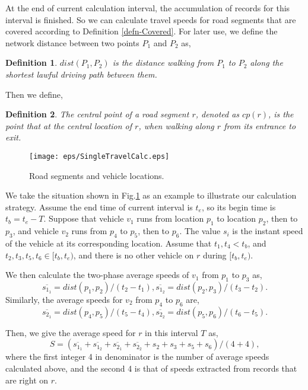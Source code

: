 \documentclass[twocolumn,10pt,final,conference]{IEEEtran}
\newtheorem{defn}{Definition}
\begin{document}
At the end of current calculation interval, the accumulation of records for this interval is finished. So we can calculate travel speeds for road segments that are covered according to Definition \ref{defn-Covered}.
For later use, we define the network distance between two points $P_1$ and $P_2$ as,
\begin{defn}\label{defn-dist for points}
$dist(P_1,P_2)$ is the distance walking from $P_{1}$ to $P_{2}$ along the shortest lawful driving path between them.
\end{defn}

Then we define,
\begin{defn}\label{defn-central point}
The \emph{central point of a road segment} $r$, denoted as $cp(r)$, is the point that at the central location of $r$, when walking along $r$ from its entrance to exit.
\end{defn}
\begin{figure}[h]
  \centering
\texttt{[image: eps/SingleTravelCalc.eps]}

\caption{Road segments and vehicle locations.}
  \label{fig-Travel Speed With Available Data}
\end{figure}

We take the situation shown in Fig.\ref{fig-Travel Speed With Available Data} as an example to illustrate our calculation strategy. Assume the end time of current interval is $t_{e}$, so its begin time is $t_{b}=t_{e}-T$.
Suppose that vehicle $v_1$ runs from location $p_1$ to location $p_2$, then to $p_3$, and vehicle $v_2$ runs from $p_4$ to $p_5$, then to $p_6$. The value $s_i$ is the instant speed of the vehicle at its corresponding location. Assume that $t_1,t_4<t_{b}$, and $t_2,t_3,t_5,t_6\in [t_{b}, t_{e})$, and there is no other vehicle on $r$ during $[t_{b}, t_{e})$.

We then calculate the two-phase average speeds of $v_1$ from $p_1$ to $p_3$ as,
\[
\overline{s_{1_1}}=dist(p_1,p_2)/(t_2-t_1),
\overline{s_{1_2}}=dist(p_2,p_3)/(t_3-t_2).
\]
Similarly, the average speeds for $v_2$ from $p_4$ to $p_6$ are,
\[
\overline{s_{2_1}}=dist(p_4,p_5)/(t_5-t_4),
\overline{s_{2_2}}=dist(p_5,p_6)/(t_6-t_5).
\]

Then, we give the average speed for $r$ in this interval $T$ as,
\[
  S={(\overline{s_{1_1}}+\overline{s_{1_2}}+\overline{s_{2_1}}+\overline{s_{2_2}}+s_2+s_3+s_5+s_6)}/{(4+4)},
\]
where the first integer 4 in denominator is the number of average speeds calculated above, and the second 4 is that of speeds extracted from records that are right on $r$.
\end{document}

